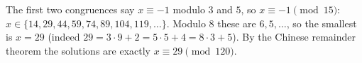 The first two congruences say $x\equiv-1$ modulo $3$ and $5$, so $x\equiv-1\pmod{15}$: $x\in\{14,29,44,59,74,89,104,119,\dots\}$. Modulo $8$ these are $6,5,\dots$, so the smallest is $x=\boxed{29}$ (indeed $29=3\cdot9+2=5\cdot5+4=8\cdot3+5$). By the Chinese remainder theorem the solutions are exactly $x\equiv29\pmod{120}$.
